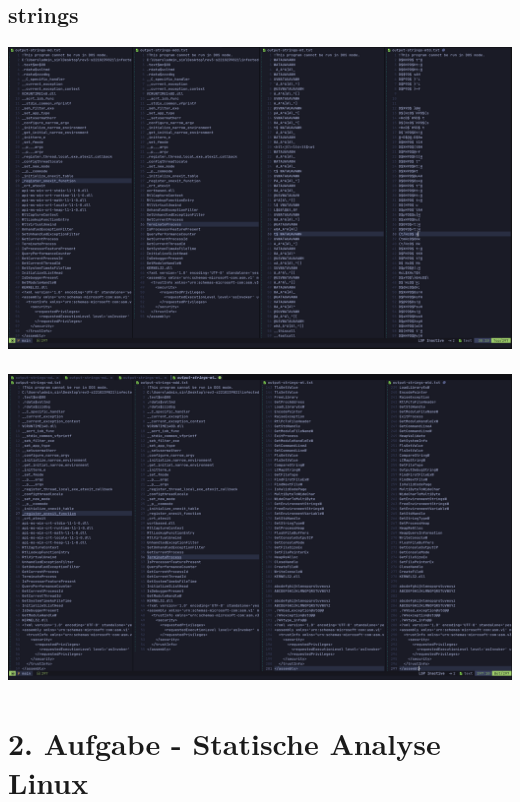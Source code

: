 \documentclass{article}
\begin{document}
	\subsection{strings}
	\includegraphics[width=1\linewidth]{pictures/1. strings from all files}\\
	\\
	\includegraphics[width=1\linewidth]{pictures/1. strings from all files.2}\\
	
	
	\pagebreak
	
	\section{2. Aufgabe - Statische Analyse Linux}
\end{document}
